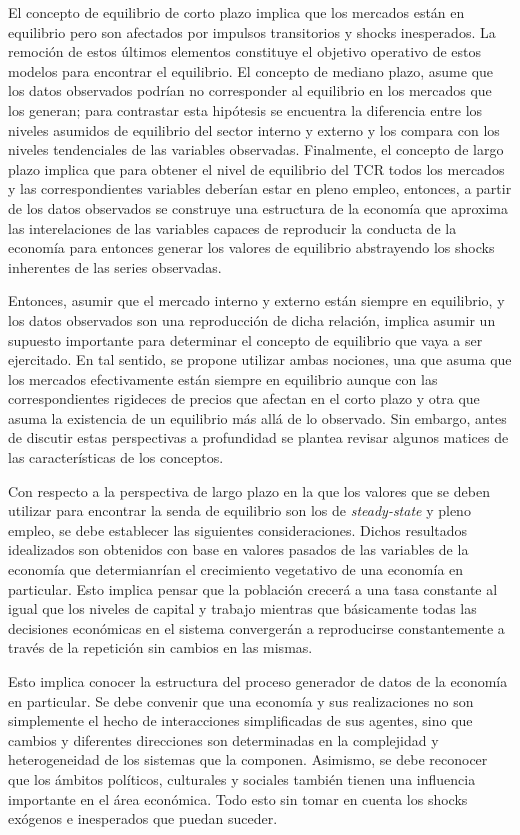 \documentclass[12pt,letterpaper]{article}
\begin{document}
El concepto de equilibrio de corto plazo implica que los mercados están en equilibrio pero son afectados por impulsos transitorios y shocks inesperados. La remoción de estos últimos elementos constituye el objetivo operativo de estos modelos para encontrar el equilibrio. El concepto de mediano plazo, asume que los datos observados podrían no corresponder al equilibrio en los mercados que los generan; para contrastar esta hipótesis se encuentra la diferencia entre los niveles asumidos de equilibrio del sector interno y externo y los compara con los niveles tendenciales de las variables observadas. Finalmente, el concepto de largo plazo implica que para obtener el nivel de equilibrio del TCR todos los mercados y las correspondientes variables deberían estar en pleno empleo, entonces, a partir de los datos observados se construye una estructura de la economía que aproxima las interelaciones de las variables capaces de reproducir la conducta de la economía para entonces generar los valores de equilibrio abstrayendo los shocks inherentes de las series observadas.

Entonces, asumir que el mercado interno y externo están siempre en equilibrio, y los datos observados son una reproducción de dicha relación, implica asumir un supuesto importante para determinar el concepto de equilibrio que vaya a ser ejercitado. En tal sentido, se propone utilizar ambas nociones, una que asuma que los mercados efectivamente están siempre en equilibrio aunque con las correspondientes rigideces de precios que afectan en el corto plazo y otra que asuma la existencia de un equilibrio más allá de lo observado. Sin embargo, antes de discutir estas perspectivas a profundidad se plantea revisar algunos matices de las características de los conceptos.

Con respecto a la perspectiva de largo plazo en la que los valores que se deben utilizar para encontrar la senda de equilibrio son los de \emph{steady-state} y pleno empleo, se debe establecer las siguientes consideraciones. Dichos resultados idealizados son obtenidos con base en valores pasados de las variables de la economía que determianrían el crecimiento vegetativo de una economía en particular. Esto implica pensar que la población crecerá a una tasa constante al igual que los niveles de capital y trabajo mientras que básicamente todas las decisiones económicas en el sistema convergerán a reproducirse constantemente a través de la repetición sin cambios en las mismas. 

Esto implica conocer la estructura del proceso generador de datos de la economía en particular. Se debe convenir que una economía y sus realizaciones no son simplemente el hecho de interacciones simplificadas de sus agentes, sino que cambios y diferentes direcciones son determinadas en la complejidad y heterogeneidad de los sistemas que la componen. Asimismo, se debe reconocer que los ámbitos políticos, culturales y sociales también tienen una influencia importante en el área económica. Todo esto sin tomar en cuenta los shocks exógenos e inesperados que puedan suceder.
\end{document}
